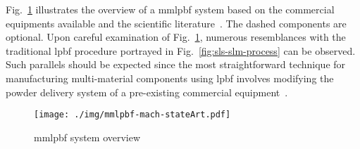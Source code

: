 Fig.~\ref{fig:mmlpbf-mach-stateArt} illustrates the overview of a \gls{mmlpbf}
system based on the commercial equipments available and the scientific
literature~\cite{aconityMachinesSite, slm500, eosM300, renishawAM500,
  trumpfTruprint500, auroraLabsRMP1, mussatto2022research}. The dashed
components are optional.
Upon careful examination of Fig.~\ref{fig:mmlpbf-mach-stateArt}, numerous
resemblances with the traditional \gls{lpbf} procedure
portrayed in Fig.~\ref{fig:sls-slm-process} can be observed. Such parallels
should be expected since the most straightforward technique for manufacturing
multi-material components using \gls{lpbf} involves modifying the powder delivery
system of a pre-existing commercial equipment~\cite{bareth2022Implem,
  schneck2022capability, nadimpali2019MMSteels, anstaett2017fabrication, edgar2015additive, liu2014interfacial}.
%
\begin{figure}[!hbtp]
  \centering
    \texttt{[image: ./img/mmlpbf-mach-stateArt.pdf]}%
    \caption[MMLPBF system overview]{\gls{mmlpbf} system overview}%
    \label{fig:mmlpbf-mach-stateArt}
  \end{figure}

